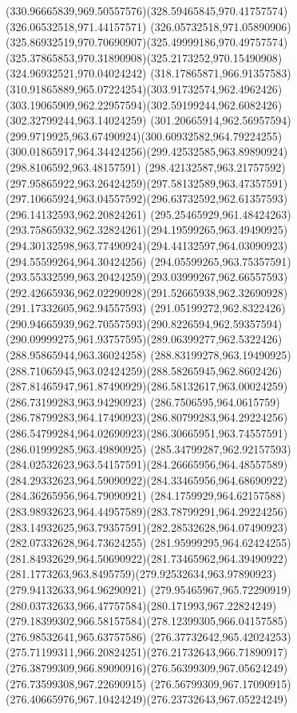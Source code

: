 {{\curveto(330.96665839,969.50557576)(328.59465845,970.41757574)(326.06532518,971.44157571)
\curveto(326.05732518,971.05890906)(325.86932519,970.70690907)(325.49999186,970.49757574)
\curveto(325.37865853,970.31890908)(325.2173252,970.15490908)(324.96932521,970.04024242)
\curveto(318.17865871,966.91357583)(310.91865889,965.07224254)(303.91732574,962.4962426)
\curveto(303.19065909,962.22957594)(302.59199244,962.6082426)(302.32799244,963.14024259)
\curveto(301.20665914,962.56957594)(299.9719925,963.67490924)(300.60932582,964.79224255)
\curveto(300.01865917,964.34424256)(299.42532585,963.89890924)(298.8106592,963.48157591)
\curveto(298.42132587,963.21757592)(297.95865922,963.26424259)(297.58132589,963.47357591)
\curveto(297.10665924,963.04557592)(296.63732592,962.61357593)(296.14132593,962.20824261)
\curveto(295.25465929,961.48424263)(293.75865932,962.32824261)(294.19599265,963.49490925)
\curveto(294.30132598,963.77490924)(294.44132597,964.03090923)(294.55599264,964.30424256)
\curveto(294.05599265,963.75357591)(293.55332599,963.20424259)(293.03999267,962.66557593)
\curveto(292.42665936,962.02290928)(291.52665938,962.32690928)(291.17332605,962.94557593)
\curveto(291.05199272,962.8322426)(290.94665939,962.70557593)(290.8226594,962.59357594)
\curveto(290.09999275,961.93757595)(289.06399277,962.5322426)(288.95865944,963.36024258)
\curveto(288.83199278,963.19490925)(288.71065945,963.02424259)(288.58265945,962.8602426)
\curveto(287.81465947,961.87490929)(286.58132617,963.00024259)(286.73199283,963.94290923)
\curveto(286.7506595,964.0615759)(286.78799283,964.17490923)(286.80799283,964.29224256)
\curveto(286.54799284,964.02690923)(286.30665951,963.74557591)(286.01999285,963.49890925)
\curveto(285.34799287,962.92157593)(284.02532623,963.54157591)(284.26665956,964.48557589)
\curveto(284.29332623,964.59090922)(284.33465956,964.68690922)(284.36265956,964.79090921)
\curveto(284.1759929,964.62157588)(283.98932623,964.44957589)(283.78799291,964.29224256)
\curveto(283.14932625,963.79357591)(282.28532628,964.07490923)(282.07332628,964.73624255)
\curveto(281.95999295,964.62424255)(281.84932629,964.50690922)(281.73465962,964.39490922)
\curveto(281.1773263,963.8495759)(279.92532634,963.97890923)(279.94132633,964.96290921)
\curveto(279.95465967,965.72290919)(280.03732633,966.47757584)(280.171993,967.22824249)
\curveto(279.18399302,966.58157584)(278.12399305,966.04157585)(276.98532641,965.63757586)
\curveto(276.37732642,965.42024253)(275.71199311,966.20824251)(276.21732643,966.71890917)
\curveto(276.38799309,966.89090916)(276.56399309,967.05624249)(276.73599308,967.22690915)
\curveto(276.56799309,967.17090915)(276.40665976,967.10424249)(276.23732643,967.05224249)
}}
